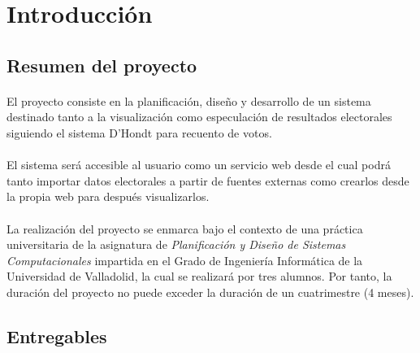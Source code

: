 \documentclass{article}
\begin{document}

	\clearpage
	\tableofcontents


	\clearpage
    \section{Introducción}

		\subsection{Resumen del proyecto}
			
            \paragraph{}
            El proyecto consiste en la planificación, diseño y desarrollo de un sistema destinado tanto a la visualización como especulación de resultados electorales siguiendo el sistema D'Hondt para recuento de votos.
            
            \paragraph{}
			El sistema será accesible al usuario como un servicio web desde el cual podrá tanto importar datos electorales a partir de fuentes externas como crearlos desde la propia web para después visualizarlos.

            \paragraph{}
			La realización del proyecto se enmarca bajo el contexto de una práctica universitaria de la asignatura de \emph{Planificación y Diseño de Sistemas Computacionales} impartida en el Grado de Ingeniería Informática de la Universidad de Valladolid, la cual se realizará por tres alumnos. Por tanto, la duración del proyecto no puede exceder la duración de un cuatrimestre (4 meses).

            
		\subsection{Entregables}
			
\end{document}
